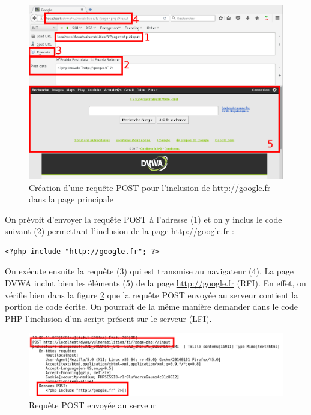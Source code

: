 \begin{figure}[!h]
\begin{center}
\includegraphics[scale=.41]{images/fi6.png}

\caption{Création d'une requête POST pour l'inclusion de \url{http://google.fr} dans la page principale}
\label{fi_dvwa6}
\end{center}
\end{figure}


On prévoit d'envoyer la requête POST à l'adresse  (1) et on y inclus le code suivant (2) permettant l'inclusion de la page \url{http://google.fr} :
\begin{lstlisting}
<?php include "http://google.fr"; ?>
\end{lstlisting}
On exécute ensuite la requête (3) qui est transmise au navigateur (4). La page DVWA inclut bien les éléments (5) de la page \url{http://google.fr} (RFI). En effet, on vérifie bien dans la figure \ref{fi_dvwa7} que la requête POST envoyée au serveur contient la portion de code écrite. On pourrait de la même manière demander dans le code PHP l'inclusion d'un script présent sur le serveur (LFI).

\begin{figure}[!h]
\begin{center}
\includegraphics[scale=.45]{images/fi7.png}

\caption{Requête POST envoyée au serveur}
\label{fi_dvwa7}
\end{center}
\end{figure}

